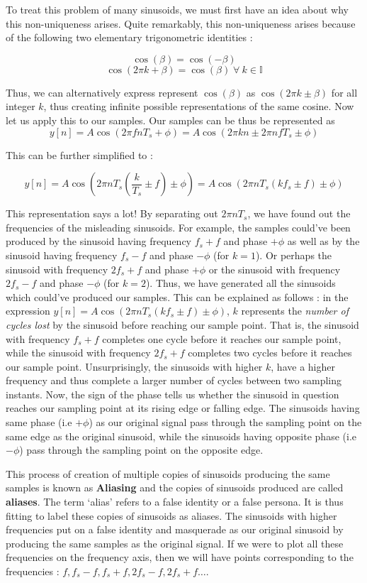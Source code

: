 \documentclass{article}
\theoremstyle{definition}
\begin{document}
	To treat this problem of many sinusoids, we must first have an idea about why this non-uniqueness arises. Quite remarkably, this non-uniqueness arises because of the following two elementary trigonometric identities :
	
	\[ 
		\cos(\beta) = \cos(-\beta)
	\]  
	\[
		\cos(2\pi k + \beta) = \cos(\beta) \; \forall\:  k \in \mathbb{I}
	\]
	
	Thus, we can alternatively express represent $\cos(\beta)$ as $\cos(2\pi k \pm \beta)$ for all integer $k$, thus creating infinite possible representations of the same cosine. Now let us apply this to our samples. Our samples can be thus be represented as
	\[ 
		y[n] = A\cos(2\pi fnT_s + \phi) = A\cos(2\pi kn \pm 2\pi nfT_s \pm \phi)
	\]
	
	This can be further simplified to : 
	
	\[
		y[n]  = A\cos(2\pi nT_s ( \frac{k}{T_s} \pm f ) \pm \phi) = A\cos(2\pi nT_s (kf_s \pm f) \pm \phi)
	\]
	
	This representation says a lot! By separating out $2\pi nT_s$, we have found out the frequencies of the misleading sinusoids. For example, the samples could've been produced by the sinusoid having frequency $f_s + f$ and phase $+ \phi$ as well as by the sinusoid having frequency $f_s - f$ and phase $- \phi$ (for $k=1$). Or perhaps the sinusoid with frequency $2f_s+f$ and phase $+ \phi$ or the sinusoid with frequency $2f_s - f$ and phase $- \phi$ (for $k=2$). Thus, we have generated all the sinusoids which could've produced our samples. This can be explained as follows : in the expression $y[n] = A\cos(2\pi nT_s(kf_s \pm f) \pm \phi)$, $k$ represents the \textit{number of cycles lost} by the sinusoid before reaching our sample point. That is, the sinusoid with frequency $f_s + f$ completes one cycle before it reaches our sample point, while the sinusoid with frequency $2f_s + f$ completes two cycles before it reaches our sample point. Unsurprisingly, the sinusoids with higher $k$, have a higher frequency and thus complete a larger number of cycles between two sampling instants. Now, the sign of the phase tells us whether the sinusoid in question reaches our sampling point at its rising edge or falling edge. The sinusoids having same phase (i.e $+ \phi$) as our original signal pass through the sampling point on the same edge as the original sinusoid, while the sinusoids having opposite phase (i.e $- \phi$) pass through the sampling point on the opposite edge. \smallskip
	
	This process of creation of multiple copies of sinusoids producing the same samples is known as \textbf{Aliasing} and the copies of sinusoids produced are called \textbf{aliases}. The term `alias' refers to a false identity or a false persona. It is thus fitting to label these copies of sinusoids as aliases. The sinusoids with higher frequencies put on a false identity and masquerade as our original sinusoid by producing the same samples as the original signal. If we were to plot all these frequencies on the frequency axis, then we will have points corresponding to the frequencies : $f, f_s-f, f_s+f, 2f_s-f, 2f_s+f \ldots$. \smallskip
	
\end{document}
